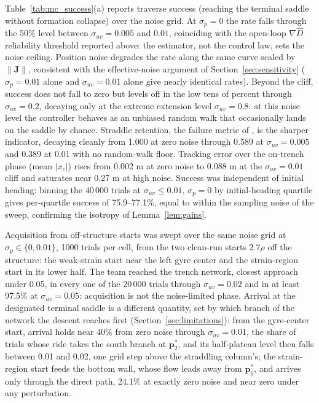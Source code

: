 \documentclass[lettersize,journal]{IEEEtran}
\begin{document}
Table~\ref{tab:mc_success}(a) reports traverse success (reaching the
terminal saddle without formation collapse) over the noise grid. At
$\sigma_p = 0$ the rate falls through the 50\% level between
$\sigma_{uv} = 0.005$ and $0.01$, coinciding with the open-loop
$\nabla\hat{D}$ reliability threshold reported above: the estimator,
not the control law, sets the noise ceiling. Position noise degrades
the rate along the same curve scaled by $\|\mathbf{J}\|$, consistent
with the effective-noise argument of Section~\ref{sec:sensitivity}
($\sigma_p = 0.01$ alone and $\sigma_{uv} = 0.01$ alone give nearly
identical rates). Beyond the cliff, success does not fall to zero but
levels off in the low tens of percent through $\sigma_{uv} = 0.2$,
decaying only at the extreme extension level $\sigma_{uv} = 0.8$: at
this noise level the controller behaves as an unbiased random walk
that occasionally lands on the saddle by chance. Straddle retention,
the failure metric
of \cite{9}, is the sharper indicator, decaying cleanly from 1.000 at
zero noise through 0.589 at $\sigma_{uv} = 0.005$ and 0.389 at 0.01
with no random-walk floor. Tracking
error over the on-trench phase (mean $|x_c|$) rises from 0.002 m at zero
noise to 0.088 m at the $\sigma_{uv} = 0.01$ cliff and saturates near
0.27 m at high noise. Success was independent of initial heading: binning the 40\,000
trials at $\sigma_{uv} \leq 0.01$, $\sigma_p = 0$ by initial-heading
quartile gives per-quartile success of 75.9--77.1\%, equal to within
the sampling noise of the sweep, confirming the isotropy of
Lemma~\ref{lem:gains}.

Acquisition from off-structure starts was swept over the same noise
grid at $\sigma_p \in \{0, 0.01\}$, 1000 trials per cell, from the two
clean-run starts $2.7\rho$ off the structure: the weak-strain start
near the left gyre center and the strain-region start in its lower
half. The team reached the trench network, closest approach under
0.05, in every one of the 20\,000 trials through $\sigma_{uv} = 0.02$
and in at least 97.5\% at $\sigma_{uv} = 0.05$: acquisition is not the
noise-limited phase. Arrival at the designated terminal saddle is a
different quantity, set by which branch of the network the descent
reaches first (Section~\ref{sec:limitations}): from the gyre-center
start, arrival holds near 40\% from zero noise through
$\sigma_{uv} = 0.01$, the share of trials whose ride takes the south
branch at $\mathbf{p}^*_2$, and its half-plateau level then falls
between 0.01 and 0.02, one grid step above the straddling column's;
the strain-region start feeds the bottom wall, whose flow leads away
from $\mathbf{p}^*_1$, and arrives only through the direct path,
24.1\% at exactly zero noise and near zero under any perturbation.
\end{document}
